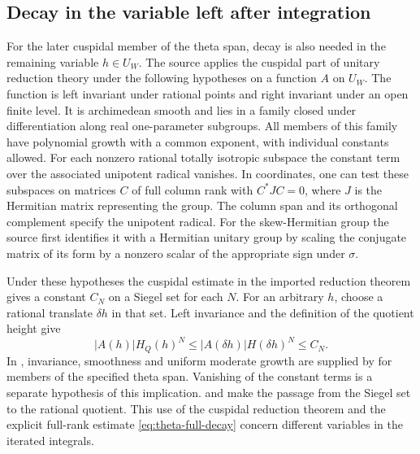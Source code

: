 \subsection{Decay in the variable left after integration}

For the later cuspidal member of the theta span, decay is also
needed in the remaining variable \(h\in U_W\). The source applies
the cuspidal part of unitary reduction theory under the following
hypotheses on a function \(A\) on \(U_W\). The function is left
invariant under rational points and right invariant under an open
finite level. It is archimedean smooth and lies in a family closed
under differentiation along real one-parameter subgroups. All
members of this family have polynomial growth with a common
exponent, with individual constants allowed. For each nonzero
rational totally isotropic subspace the constant term over the
associated unipotent radical vanishes. In coordinates, one can
test these subspaces on matrices \(C\) of full column rank with
\(C^*JC=0\), where \(J\) is the Hermitian matrix representing the
group. The column span and its orthogonal complement specify the
unipotent radical. For the skew-Hermitian group the source first
identifies it with a Hermitian unitary group by scaling the
conjugate matrix of its form by a nonzero scalar of the appropriate
sign under \(\sigma\).

Under these hypotheses the cuspidal estimate in the imported
reduction theorem gives a constant \(C_N\) on a Siegel set for each
\(N\). For an arbitrary \(h\), choose a rational translate
\(\delta h\) in that set. Left invariance and the definition of the
quotient height give
\[
 |A(h)|H_Q(h)^N\le |A(\delta h)|H(\delta h)^N\le C_N .
\]
In , invariance, smoothness and
uniform moderate growth are supplied by  for
members of the specified theta span. Vanishing of the constant
terms is a separate hypothesis of this implication.
 and 
make the passage from the Siegel set to the rational quotient.
This use of the cuspidal reduction theorem and the explicit
full-rank estimate \eqref{eq:theta-full-decay} concern different
variables in the iterated integrals.

